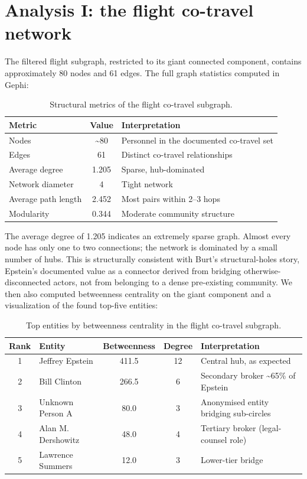 \section{Analysis I: the flight co-travel network}
The filtered flight subgraph, restricted to its giant connected component, contains approximately 80 nodes and 61 edges. The full graph statistics computed in Gephi:
\begin{table}[H]
    \centering
    \begin{tabular}{l c l}
        \toprule
        Metric & Value & Interpretation \\
        \midrule
            Nodes  & \textasciitilde{}80 & Personnel in the documented co-travel set \\
            Edges  & 61 & Distinct co-travel relationships \\
            Average degree & 1.205 & Sparse, hub-dominated \\
            Network diameter & 4 & Tight network \\
            Average path length & 2.452 & Most pairs within 2--3 hops \\
            Modularity  & 0.344 & Moderate community structure \\
        \bottomrule
    \end{tabular}
    \caption{Structural metrics of the flight co-travel subgraph.}
    \label{tab:flight_metrics}
\end{table}
The average degree of 1.205 indicates an extremely sparse graph. Almost every node has only one to two connections; the network is dominated by a small number of hubs. This is structurally consistent with Burt's structural-holes story, Epstein's documented value as a connector derived from bridging otherwise-disconnected actors, not from belonging to a dense pre-existing community.
We then also computed betweenness centrality on the giant component and a visualization of the found top-five entities:
\begin{table}[H]
    \centering
    \begin{tabular}{c l c c l}
        \toprule
        Rank & Entity & Betweenness & Degree & Interpretation \\
        \midrule
            1 & Jeffrey Epstein & 411.5 & 12 & Central hub, as expected \\
            2 & Bill Clinton & 266.5 & 6 & Secondary broker \textasciitilde{}65\% of Epstein \\
            3 & Unknown Person A & 80.0 & 3 & Anonymised entity bridging sub-circles \\
            4 & Alan M. Dershowitz & 48.0 & 4 & Tertiary broker (legal-counsel role) \\
            5 & Lawrence Summers & 12.0 & 3 & Lower-tier bridge \\
        \bottomrule
    \end{tabular}
    \caption{Top entities by betweenness centrality in the flight co-travel subgraph.}
    \label{tab:flight_betweenness}
\end{table}

